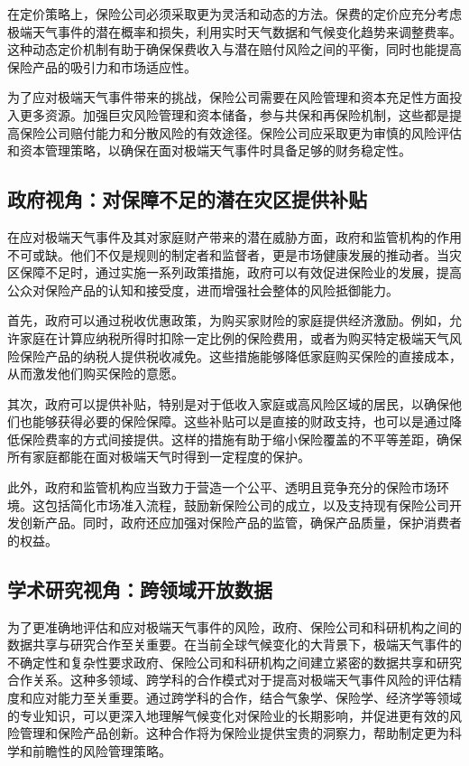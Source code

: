 在定价策略上，保险公司必须采取更为灵活和动态的方法。保费的定价应充分考虑极端天气事件的潜在概率和损失，利用实时天气数据和气候变化趋势来调整费率。这种动态定价机制有助于确保保费收入与潜在赔付风险之间的平衡，同时也能提高保险产品的吸引力和市场适应性。

为了应对极端天气事件带来的挑战，保险公司需要在风险管理和资本充足性方面投入更多资源。加强巨灾风险管理和资本储备，参与共保和再保险机制，这些都是提高保险公司赔付能力和分散风险的有效途径。保险公司应采取更为审慎的风险评估和资本管理策略，以确保在面对极端天气事件时具备足够的财务稳定性。
\subsection{政府视角：对保障不足的潜在灾区提供补贴}

在应对极端天气事件及其对家庭财产带来的潜在威胁方面，政府和监管机构的作用不可或缺。他们不仅是规则的制定者和监督者，更是市场健康发展的推动者。当灾区保障不足时，通过实施一系列政策措施，政府可以有效促进保险业的发展，提高公众对保险产品的认知和接受度，进而增强社会整体的风险抵御能力。

首先，政府可以通过税收优惠政策，为购买家财险的家庭提供经济激励。例如，允许家庭在计算应纳税所得时扣除一定比例的保险费用，或者为购买特定极端天气风险保险产品的纳税人提供税收减免。这些措施能够降低家庭购买保险的直接成本，从而激发他们购买保险的意愿。

其次，政府可以提供补贴，特别是对于低收入家庭或高风险区域的居民，以确保他们也能够获得必要的保险保障。这些补贴可以是直接的财政支持，也可以是通过降低保险费率的方式间接提供。这样的措施有助于缩小保险覆盖的不平等差距，确保所有家庭都能在面对极端天气时得到一定程度的保护。

此外，政府和监管机构应当致力于营造一个公平、透明且竞争充分的保险市场环境。这包括简化市场准入流程，鼓励新保险公司的成立，以及支持现有保险公司开发创新产品。同时，政府还应加强对保险产品的监管，确保产品质量，保护消费者的权益。

\subsection{学术研究视角：跨领域开放数据}
为了更准确地评估和应对极端天气事件的风险，政府、保险公司和科研机构之间的数据共享与研究合作至关重要。在当前全球气候变化的大背景下，极端天气事件的不确定性和复杂性要求政府、保险公司和科研机构之间建立紧密的数据共享和研究合作关系。这种多领域、跨学科的合作模式对于提高对极端天气事件风险的评估精度和应对能力至关重要。通过跨学科的合作，结合气象学、保险学、经济学等领域的专业知识，可以更深入地理解气候变化对保险业的长期影响，并促进更有效的风险管理和保险产品创新。这种合作将为保险业提供宝贵的洞察力，帮助制定更为科学和前瞻性的风险管理策略。


